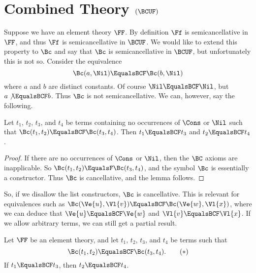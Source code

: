 \section{Combined Theory $(\BCUF)$}\label{sec:cancel}

Suppose we have an element theory $\FF$. By definition $\Ff$ is
semicancellative in $\FF$, and thus $\Ff$ is semicancellative in $\BCUF$. We
would like to extend this property to $\Bc$ and say that $\Bc$ is
semicancellative in $\BCUF$, but unfortunately this is not so. Consider the
equivalence
\[\Bc(a, \Nil) \EqualsBCF \Bc(b, \Nil)\]
where $a$ and $b$ are distinct constants. Of course $\Nil \EqualsBCF \Nil$, but
$a \not\EqualsBCF b$. Thus $\Bc$ is not semicancellative. We can, however, say
the following.

\begin{Lemma}\label{lemma:bc-listless-cancel}
    Let $t_1$, $t_2$, $t_3$, and $t_4$ be terms containing no occurrences of
    $\Cons$ or $\Nil$ such that $\Bc(t_1, t_2) \EqualsBCF \Bc(t_3, t_4)$. Then
    $t_1 \EqualsBCF t_3$ and $t_2 \EqualsBCF t_4$.
\end{Lemma}

\begin{proof}
    If there are no occurrences of $\Cons$ or $\Nil$, then the $\BC$ axioms are
    inapplicable. So $\Bc(t_1, t_2) \EqualsF \Bc(t_3, t_4)$, and the symbol
    $\Bc$ is essentially a constructor. Thus $\Bc$ is cancellative, and the
    lemma follows.
\end{proof}

So, if we disallow the list constructors, $\Bc$ is cancellative. This is
relevant for equivalences such as $\Bc(\Ve{u}, \Vl{v}) \EqualsBCF \Bc(\Ve{w},
\Vl{x})$, where we can deduce that $\Ve{u} \EqualsBCF \Ve{w}$ and $\Vl{v}
\EqualsBCF \Vl{x}$. If we allow arbitrary terms, we can still get a partial
result.

\begin{Lemma}\label{lemma:bc-left-cancel}
    Let $\FF$ be an element theory, and let $t_1$, $t_2$, $t_3$, and $t_4$ be
    terms such that
    \begin{equation}\label{eq:bc-left-cancel}
        \Bc(t_1, t_2) \EqualsBCF \Bc(t_3, t_4). \tag{$\ast$}
    \end{equation}
    If $t_1 \EqualsBCF t_3$, then $t_2 \EqualsBCF t_4$.
\end{Lemma}

